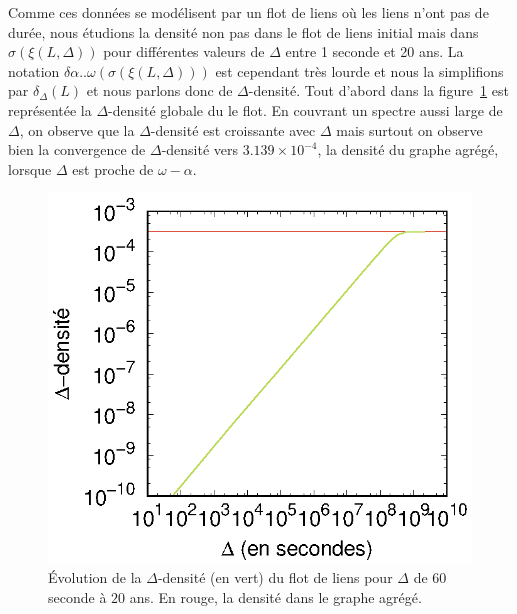 Comme ces données se modélisent par un flot de liens où les liens n'ont pas de durée, nous étudions la densité non pas dans le flot de liens initial mais dans $\sigma(\xi(L,\Delta))$  pour différentes valeurs de $\Delta$ entre 1 seconde et 20 ans.
La notation $\delta{\alpha..\omega}(\sigma(\xi(L,\Delta)))$ est cependant très lourde et nous la simplifions par $\delta_{\Delta}(L)$ et nous parlons donc de $\Delta$-densité.
Tout d'abord dans la figure~\ref{fig:dens_fil_discusion} est représentée la $\Delta$-densité globale du le flot.
En couvrant un spectre aussi large de $\Delta$, on observe que la $\Delta$-densité est croissante avec $\Delta$ mais surtout on observe bien la convergence de $\Delta$-densité vers $3.139\times 10^{-4}$, la densité du graphe agrégé, lorsque $\Delta$ est proche de $\omega - \alpha$.

\begin{figure}
	\centering
	\includegraphics[width=0.4\linewidth]{img/mailing/global_loglog.eps}
	\caption{Évolution de la $\Delta$-densité (en vert) du flot de liens pour $\Delta$ de $60$ seconde à $20$ ans. En rouge, la densité dans le graphe agrégé.}
	\label{fig:dens_fil_discusion}
\end{figure}

